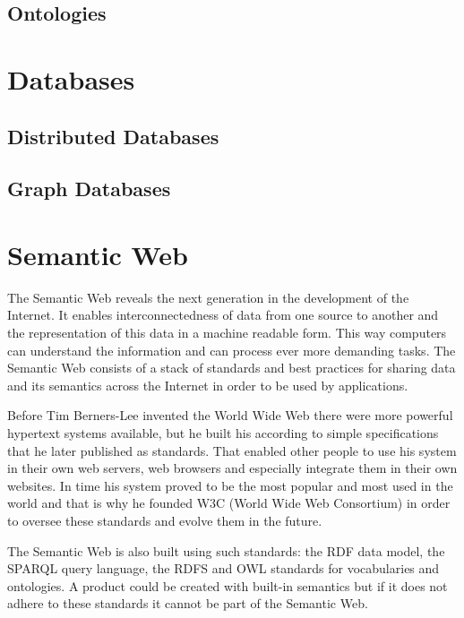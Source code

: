 \subsection{Ontologies}
\section{Databases}
\subsection{Distributed Databases}
\subsection{Graph Databases}
\section{Semantic Web}
The Semantic Web reveals the next generation in the development of the Internet. It enables interconnectedness of data from one source to another and the representation of this data in a machine readable form. This way computers can understand the information and can process ever more demanding tasks. The Semantic Web consists of a stack of standards and best practices for sharing data and its semantics across the Internet in order to be used by applications.

Before Tim Berners-Lee invented the World Wide Web
there were more powerful hypertext systems available, but he built his according to simple specifications that he later published as standards. That enabled other people to use his system in their own web servers, web browsers and especially integrate them in their own websites. In time his system proved to be the most popular and most used in the world and that is why he founded W3C (World Wide Web Consortium) in order to oversee these standards and evolve them in the future.

The Semantic Web is also built using such standards: the RDF data model, the SPARQL query language, the RDFS and OWL standards for vocabularies and ontologies. A product could be created with built-in semantics but if it does not adhere to these standards it cannot be part of the Semantic Web. 

